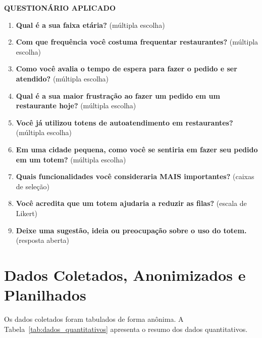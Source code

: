 \documentclass[12pt, oneside, a4paper, chapter=TITLE,section=TITLE]{abntex2}
\begin{document}
\noindent\textbf{QUESTIONÁRIO APLICADO}
\begin{enumerate}
    \item \textbf{Qual é a sua faixa etária?} (múltipla escolha)
    \item \textbf{Com que frequência você costuma frequentar restaurantes?} (múltipla escolha)
    \item \textbf{Como você avalia o tempo de espera para fazer o pedido e ser atendido?} (múltipla escolha)
    \item \textbf{Qual é a sua maior frustração ao fazer um pedido em um restaurante hoje?} (múltipla escolha)
    \item \textbf{Você já utilizou totens de autoatendimento em restaurantes?} (múltipla escolha)
    \item \textbf{Em uma cidade pequena, como você se sentiria em fazer seu pedido em um totem?} (múltipla escolha)
    \item \textbf{Quais funcionalidades você consideraria MAIS importantes?} (caixas de seleção)
    \item \textbf{Você acredita que um totem ajudaria a reduzir as filas?} (escala de Likert)
    \item \textbf{Deixe uma sugestão, ideia ou preocupação sobre o uso do totem.} (resposta aberta)
\end{enumerate}

\section{Dados Coletados, Anonimizados e Planilhados}

Os dados coletados foram tabulados de forma anônima. A Tabela~\ref{tab:dados_quantitativos} apresenta o resumo dos dados quantitativos.
\end{document}
